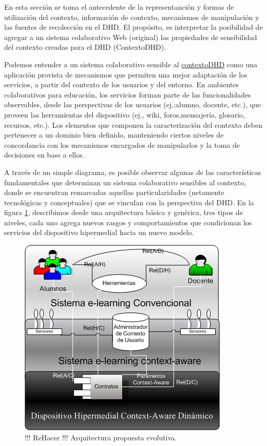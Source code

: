 En esta sección se toma el antecedente de la representanción y
formas de utilización del contexto, información de contexto, mecanismos de
manipulación y las fuentes de recolección en el DHD. El propósito, es
interpretar la posibilidad de agregar a un sistema
colaborativo Web (original) las propiedades de sensibilidad del
contexto creadas para el DHD (ContextoDHD).

Podemos entender a un sistema colaborativo sensible al
\hyperref[contextodhd]{contextoDHD} como una
aplicación provista de mecanismos que permiten una mejor adaptación de los
servicios, a partir del contexto de los usuarios y del entorno. En ambientes
colaborativos para educación, los servicios forman parte de las funcionalidades
observables, desde las perspectivas de los usuarios (ej.:alumno, docente, etc.),
que proveen las herramientas del dispositivo (ej., wiki, foros,mensajería,
glosario, recursos, etc.). Los elementos que componen la caracterización del
contexto deben pertenecer a un dominio bien definido, manteniendo ciertos
niveles de concordancia con los mecanismos encargados de manipularlos y la toma
de decisiones en base a ellos.

A través de un simple diagrama, es posible observar algunas de las características
fundamentales que determinan un sistema colaborativo sensibles al contexto,
donde se
encuentran remarcadas aquellas particularidades (netamente tecnológicas y
conceptuales) que se vinculan con la perspectiva del DHD. En la figura
\ref{fig:evolucion}, describimos desde una arquitectura básica y genérica, tres
tipos de niveles, cada uno agrega nuevos rasgos y comportamientos que
condicionan los servicios del dispositivo hipermedial hacia un nuevo modelo.

\begin{figure}
\begin{center}
 \includegraphics[width=4 in,totalheight=4in] {Ch1/f1.jpg}
\caption{!!! ReHacer !!! Arquitectura propuesta
evolutiva.}\label{fig:evolucion}
\end{center}
\end{figure}

